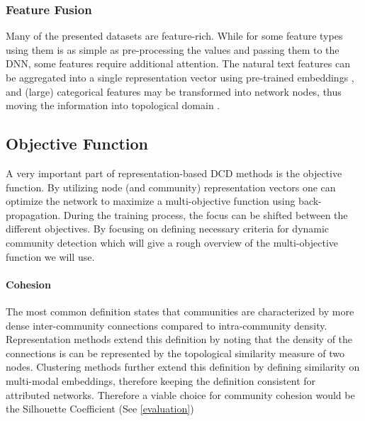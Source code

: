 \documentclass[
acmsmall,
nonacm,
screen,
acmthm]{acmart}
\begin{document}
\hypertarget{feature-fusion}{%
\subsubsection{Feature Fusion}\label{feature-fusion}}

Many of the presented datasets are feature-rich. While for some feature
types using them is as simple as pre-processing the values and passing
them to the DNN, some features require additional attention. The natural
text features can be aggregated into a single representation vector
using pre-trained embeddings
\citep{devlinBERTPretrainingDeep2019, penningtonGloveGlobalVectors2014},
and (large) categorical features may be transformed into network nodes,
thus moving the information into topological domain
\citep{chenCatGCNGraphConvolutional2021, wuTopologicalMachineLearning2020}.

\hypertarget{objective-function}{%
\subsection{Objective Function}\label{objective-function}}

A very important part of representation-based DCD methods is the
objective function. By utilizing node (and community) representation
vectors one can optimize the network to maximize a multi-objective
function using back-propagation. During the training process, the focus
can be shifted between the different objectives. By focusing on defining
necessary criteria for dynamic community detection which will give a
rough overview of the multi-objective function we will use.

\hypertarget{cohesion}{%
\paragraph{Cohesion}\label{cohesion}}

The most common definition states that communities are characterized by
more dense inter-community connections compared to intra-community
density. Representation methods extend this definition by noting that
the density of the connections is can be represented by the topological
similarity measure of two nodes. Clustering methods further extend this
definition by defining similarity on multi-modal embeddings, therefore
keeping the definition consistent for attributed networks. Therefore a
viable choice for community cohesion would be the Silhouette Coefficient
(See \cref{evaluation})
\end{document}
